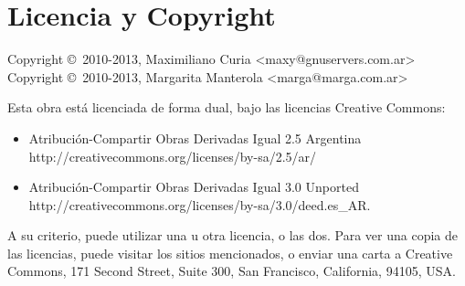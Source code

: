 
\chapter*{Licencia y Copyright}

{\noindent
Copyright \copyright\ 2010-2013, Maximiliano Curia <maxy@gnuservers.com.ar> \\
Copyright \copyright\ 2010-2013, Margarita Manterola <marga@marga.com.ar> \\
}

Esta obra está licenciada de forma dual, bajo las licencias Creative Commons: 

\begin{itemize}
\item Atribución-Compartir Obras Derivadas Igual 2.5 Argentina \\ http://creativecommons.org/licenses/by-sa/2.5/ar/
\item Atribución-Compartir Obras Derivadas Igual 3.0 Unported \\ http://creativecommons.org/licenses/by-sa/3.0/deed.es\_AR.
\end{itemize}

A su criterio, puede utilizar una u otra licencia, o las dos. Para ver una copia de las licencias, puede visitar los sitios mencionados, o enviar una carta a Creative Commons, 171 Second Street, Suite 300, San Francisco, California, 94105, USA.
